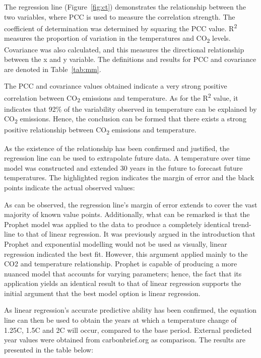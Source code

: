 \documentclass[12pt]{mcmthesis}
\begin{document}
    The regression line (Figure~\ref{fig:ct}) demonstrates the relationship between the two variables, where PCC is used to measure the correlation strength. The coefficient of determination was determined by squaring the PCC value. R\textsuperscript{2} measures the proportion of variation in the temperatures and CO\textsubscript{2} levels. Covariance was also calculated, and this measures the directional relationship between the x and y variable. The definitions and results for PCC and covariance are denoted in Table~\ref{tab:mm}.

    The PCC and covariance values obtained indicate a very strong positive correlation between CO\textsubscript{2} emissions and temperature. As for the R\textsuperscript{2} value, it indicates that 92\% of the variability observed in temperature can be explained by CO\textsubscript{2} emissions. Hence, the conclusion can be formed that there exists a strong positive relationship between CO\textsubscript{2} emissions and temperature.

    As the existence of the relationship has been confirmed and justified, the regression line can be used to extrapolate future data. A temperature over time model was constructed and extended 30 years in the future to forecast future temperatures. The highlighted region indicates the margin of error and the black points indicate the actual observed values:

    As can be observed, the regression line’s margin of error extends to cover the vast majority of known value points. Additionally, what can be remarked is that the Prophet model was applied to the data to produce a completely identical trend-line to that of linear regression. It was previously argued in the introduction that Prophet and exponential modelling would not be used as visually, linear regression indicated the best fit. However, this argument applied mainly to the CO2 and temperature relationship. Prophet is capable of producing a more nuanced model that accounts for varying parameters; hence, the fact that its application yields an identical result to that of linear regression supports the initial argument that the best model option is linear regression.

    As linear regression’s accurate predictive ability has been confirmed, the equation line can then be used to obtain the years at which a temperature change of 1.25C, 1.5C and 2C will occur, compared to the base period. External predicted year values were obtained from carbonbrief.org as comparison. The results are presented in the table below:
\end{document}
